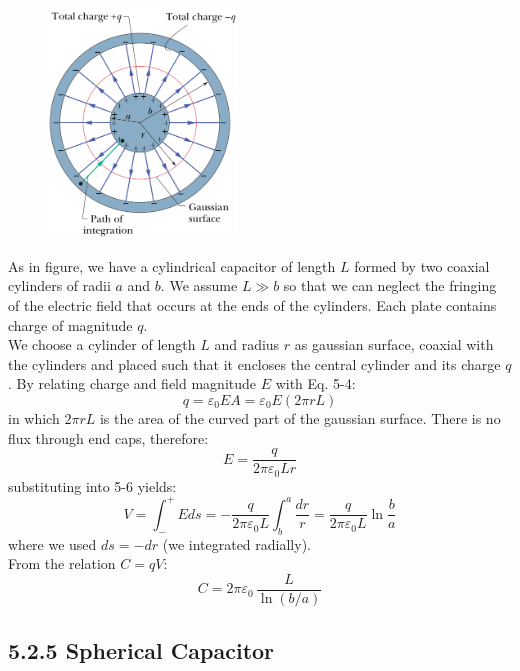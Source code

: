\documentclass[12pt, a4paper]{article}
\begin{document}
		\begin{figure}
			\centering
			\includegraphics[width=5cm]{Physics2_PNGs/cylindrical-capacitor.png}
			\caption*{}
			\label{fig:cylindrical-capacitor.png}
		\end{figure}
		As in figure, we have a cylindrical capacitor of length $L$ formed by two coaxial cylinders of radii $a$ and $b$. We assume $L \gg b$ so that we can neglect the fringing of the electric field that occurs at the ends of the cylinders. Each plate contains charge of magnitude $q$. \\
		We choose a cylinder of length $L$ and radius $r$ as gaussian surface, coaxial with the cylinders and placed such that it encloses the central cylinder and its charge $q$. By relating charge and field magnitude $E$ with Eq. 5-4:
		\[
			q = \varepsilon_0 E A = \varepsilon_0 E (2 \pi r L)
		\]
		in which $2 \pi r L$ is the area of the curved part of the gaussian surface. There is no flux through end caps, therefore:
		\[
			E = \frac{q}{2 \pi \varepsilon_0 L r}
			\tag{5-11}
		\]
		substituting into 5-6 yields:
		\[
			V = \int_{-}^{+} E ds 
			  = - \frac{q}{2 \pi \varepsilon_0 L} \int_{b}^{a} \frac{dr}{r}
			  = \frac{q}{2 \pi \varepsilon_0 L} \ln \frac{b}{a}  
			  \tag{5-12}
		\]
		where we used $ds = -dr$ (we integrated radially). \\
		From the relation $C = qV$:
		\begin{equation*}
			C = 2 \pi \varepsilon_0 \, \frac{L}{\ln (b/a)}
			\tag{Cylindrical Capacitor, 5-13}
		\end{equation*}
		
		
		
		\subsection*{5.2.5 Spherical Capacitor}
		
\end{document}
